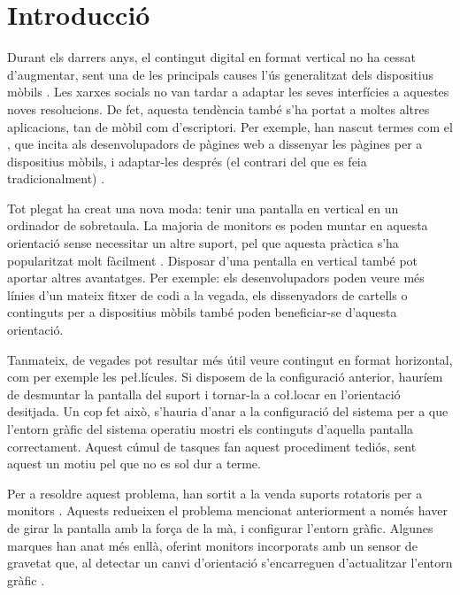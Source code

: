 \chapter{Introducció}
\label{cap:introduccio}

Durant els darrers anys, el contingut digital en format vertical no ha cessat
d'augmentar, sent una de les principals causes l'ús generalitzat dels
dispositius mòbils \cite{Navarro2023El}. Les xarxes socials no van tardar a
adaptar les seves interfícies a aquestes noves resolucions. De fet, aquesta
tendència també s'ha portat a moltes altres aplicacions, tan de mòbil com
d'escriptori. Per exemple, han nascut termes com el
, que incita als desenvolupadors de pàgines web
a dissenyar les pàgines per a dispositius mòbils, i adaptar-les després
(el contrari del que es feia tradicionalment) \cite{varrela2015mobile}.

Tot plegat ha creat una nova moda: tenir una pantalla en vertical
en un ordinador de sobretaula. La majoria de monitors es poden muntar en
aquesta orientació sense necessitar un altre suport, pel que aquesta pràctica
s'ha popularitzat molt fàcilment \cite{WeardenPortrait}.
Disposar d'una pentalla en vertical també pot aportar altres avantatges. Per
exemple: els desenvolupadors poden veure més línies d'un mateix fitxer de codi
a la vegada, els dissenyadors de cartells o continguts per a dispositius mòbils
també poden beneficiar-se d'aquesta orientació.

Tanmateix, de vegades pot resultar més útil veure contingut en format
horizontal, com per exemple les pe\l.lícules. Si disposem de la configuració
anterior, hauríem de desmuntar la pantalla del suport i tornar-la a co\l.locar
en l'orientació desitjada. Un cop fet això, s'hauria d'anar a la configuració
del sistema per a que l'entorn gràfic del sistema operatiu mostri els continguts
d'aquella pantalla correctament. Aquest cúmul de tasques fan aquest procediment
tediós, sent aquest un motiu pel que no es sol dur a terme.

Per a resoldre aquest problema, han sortit a la venda suports rotatoris per a 
monitors \cite{DIGITUSUniversal}. Aquests redueixen el problema mencionat
anteriorment a només haver de girar la pantalla amb la força de la mà, i
configurar l'entorn gràfic. Algunes marques han anat més enllà, oferint
monitors incorporats amb un sensor de gravetat que, al detectar un canvi
d'orientació s'encarreguen d'actualitzar l'entorn gràfic \cite{LCLC}.

